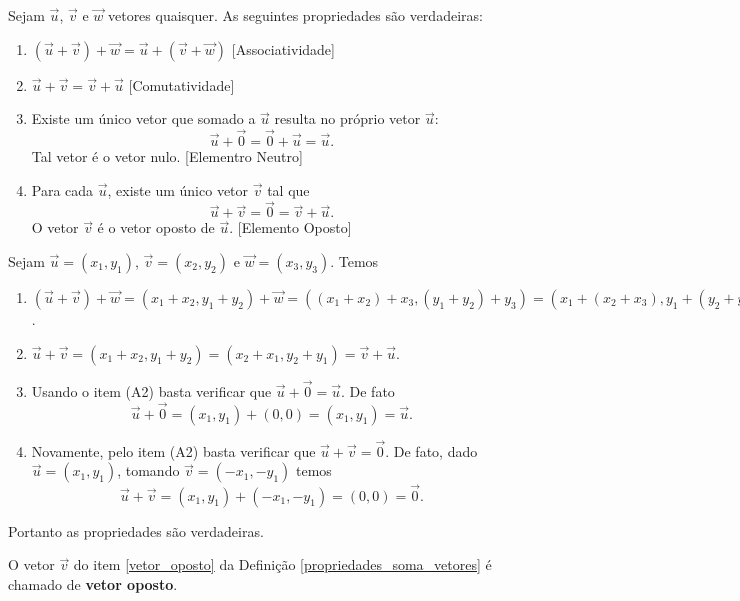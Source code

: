 \begin{propriedades}\label{propriedades_soma_vetores}
  Sejam $\vec{u}$, $\vec{v}$ e $\vec{w}$ vetores quaisquer. As seguintes propriedades s\~ao verdadeiras:
  \begin{enumerate}[label=({\roman*})]
    \item $(\vec{u} + \vec{v}) + \vec{w} = \vec{u} + (\vec{v} + \vec{w})$ [Associatividade]
    \item $\vec{u} + \vec{v} = \vec{v} + \vec{u}$ [Comutatividade]
    \item Existe um \'unico vetor que somado a $\vec{u}$ resulta no pr\'oprio vetor $\vec{u}$:
    \[
      \vec{u} + \vec{0} = \vec{0} + \vec{u} = \vec{u}.
    \]
    Tal vetor \'e o vetor nulo. [Elementro Neutro]
    \item\label{vetor_oposto} Para cada $\vec{u}$, existe um \'unico vetor $\vec{v}$ tal que
    \[
      \vec{u} + \vec{v} = \vec{0} = \vec{v} + \vec{u}.
    \]
    O vetor $\vec{v}$ \'e o vetor oposto de $\vec{u}$. [Elemento Oposto]
  \end{enumerate}
\end{propriedades}
\begin{prova}
	Sejam $\vec{u} = (x_1,y_1)$, $\vec{v} = (x_2,y_2)$ e $\vec{w} = (x_3,y_3)$. Temos
	\begin{enumerate}[label=({\roman*})]
		\item $(\vec{u} + \vec{v}) + \vec{w} = (x_1+x_2,y_1+y_2) + \vec{w} = ((x_1+x_2)+x_3,(y_1+y_2)+y_3) = (x_1+(x_2+x_3),y_1+(y_2+y_3)) = \vec{u} + (x_2+x_3,y_2+y_3) = \vec{u} + (\vec{v} + \vec{w})$.
		\item $\vec{u} + \vec{v} = (x_1+x_2,y_1+y_2) = (x_2+x_1,y_2+y_1) = \vec{v} + \vec{u}$.
		\item Usando o item (A2) basta verificar que $\vec{u} + \vec{0} = \vec{u}$. De fato
		\[
      		\vec{u} + \vec{0} = (x_1,y_1) + (0,0) = (x_1,y_1) = \vec{u}.
    	\]
    	\item Novamente, pelo item (A2) basta verificar que $\vec{u} + \vec{v} = \vec{0}$. De fato, dado $\vec{u} = (x_1,y_1)$, tomando $\vec{v} = (-x_1,-y_1)$ temos
    	\[
    		\vec{u} + \vec{v} = (x_1,y_1) + (-x_1,-y_1) = (0,0) = \vec{0}.
    	\]
	\end{enumerate}
	Portanto as propriedades s\~ao verdadeiras.
\end{prova}

\begin{definicao}
	O vetor $\vec{v}$ do item \ref{vetor_oposto} da Defini\c{c}\~ao \ref{propriedades_soma_vetores} \'e chamado de \textbf{vetor oposto}.
\end{definicao}


